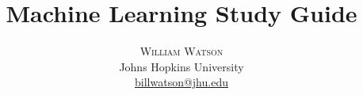 \documentclass[twoside,twocolumn]{article}
\title{Machine Learning Study Guide}
\author{%
  \textsc{William Watson} \\[1ex]
  \normalsize Johns Hopkins University \\
  \normalsize \href{mailto:billwatson@jhu.edu}{billwatson@jhu.edu}
}
\date{}%
\begin{document}
\maketitle

\tableofcontents
\onecolumn


























% 
% 

\end{document}

